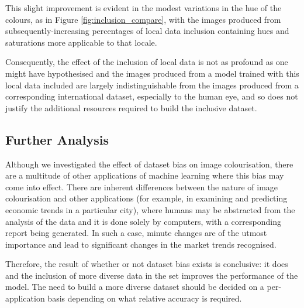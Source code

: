 \documentclass[conference]{IEEEtran}
\begin{document}
This slight improvement is evident in the modest variations in the hue of the colours, as in Figure \ref{fig:inclusion_compare}, with the images produced from subsequently-increasing percentages of local data inclusion containing hues and saturations more applicable to that locale.

Consequently, the effect of the inclusion of local data is not as profound as one might have hypothesised and the images produced from a model trained with this local data included are largely indistinguishable from the images produced from a corresponding international dataset, especially to the human eye, and so does not justify the additional resources required to build the inclusive dataset.

\subsection{Further Analysis}

Although we investigated the effect of dataset bias on image colourisation, there are a multitude of other applications of machine learning where this bias may come into effect. There are inherent differences between the nature of image colourisation and other applications (for example, in examining and predicting economic trends in a particular city), where humans may be abstracted from the analysis of the data and it is done solely by computers, with a corresponding report being generated. In such a case, minute changes are of the utmost importance and lead to significant changes in the market trends recognised.

Therefore, the result of whether or not dataset bias exists is conclusive: it does and the inclusion of more diverse data in the set improves the performance of the model. The need to build a more diverse dataset should be decided on a per-application basis depending on what relative accuracy is required.

\medskip
 




\end{document}
